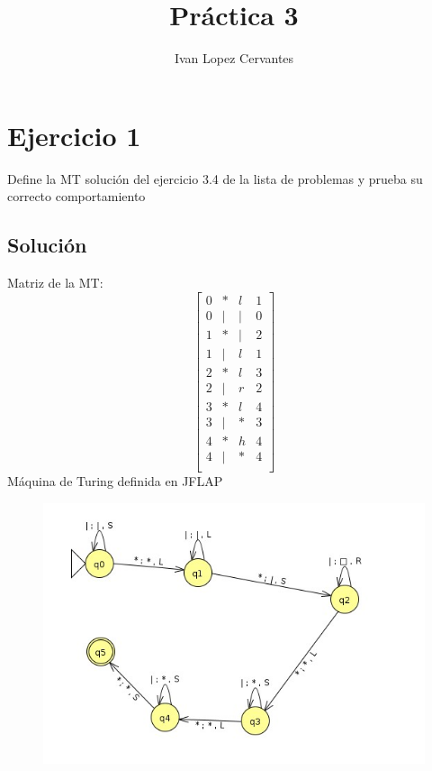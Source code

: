 \documentclass{article}
\author{Ivan Lopez Cervantes }
\date{}
\begin{document}
\title{Práctica 3}
\maketitle


\maketitle

\section{Ejercicio 1}
Define la MT solución del ejercicio 3.4 de la lista de problemas y prueba su correcto comportamiento
\subsection*{Solución}
Matriz de la MT:
\begin{equation*}
\begin{bmatrix}
0 & * & l & 1\\
0 & | & | & 0\\
1 & * & | & 2\\
1 & | & l & 1\\
2 & * & l & 3\\
2 & | & r & 2\\
3 & * & l & 4\\
3 & | & * & 3\\
4 & * & h & 4\\
4 & | & * & 4\\
\end{bmatrix}
\end{equation*}
Máquina de Turing definida en JFLAP
\begin{figure}[h]
    \centering
    \includegraphics[scale=0.5]{MT.jpg}
\end{figure}
\newpage
\end{document}
